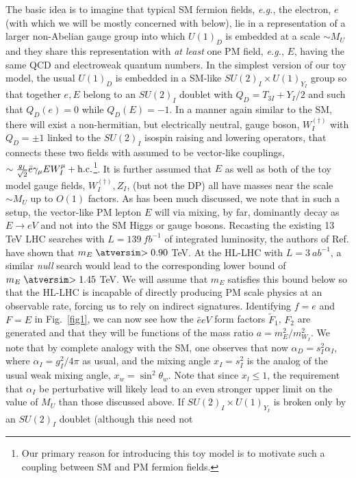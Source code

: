 \documentclass[14pt]{article}
\def\eg{{\it e.g.}}
\def\to{\rightarrow}
\def\matth{\mathsurround=0pt}
\def\gsim{\mathrel{\mathpalette\atversim>}}
\def\atversim#1#2{\lower0.7ex\vbox{\baselineskip\zatskip\lineskip\zatskip
  \lineskiplimit 0pt\ialign{$\matth#1\hfil##\hfil$\crcr#2\crcr\sim\crcr}}}
\begin{document}
The basic idea is to imagine that typical SM fermion fields, \eg, the electron, $e$ (with which we will be mostly concerned with below),  
lie in a representation of a larger non-Abelian gauge group into which $U(1)_D$ is embedded at a scale 
$\sim M_U$ and they share this representation with {\it at least} one PM field, \eg, $E$, having the same QCD and electroweak quantum numbers. In the simplest version of our toy model, the usual 
$U(1)_D$ is embedded in a SM-like $SU(2)_I\times U(1)_{Y_I}$ group so that 
together $e,E$ belong to an $SU(2)_I$ doublet with $Q_D=T_{3I}+Y_I/2$ and such that $Q_D(e)=0$ while $Q_D(E)=-1$. In a manner again similar to the SM, there will exist a non-hermitian, 
but electrically neutral, gauge boson, $W_I^{(\dagger)}$ with $Q_D=\pm 1$ linked to the $SU(2)_I$ isospin raising and lowering operators, that connects these two fields with assumed to be vector-like 
couplings, $\sim \frac{g_I}{\sqrt 2} \bar e\gamma_\mu EW_I^\mu+{\rm {h.c.}}${\footnote{Our primary reason for introducing this toy model is to motivate such a coupling between SM and PM 
fermion fields.}}. It is further assumed that $E$ as well as both of the toy model gauge fields, $W_I^{(\dagger)},Z_I$,  (but not the DP) all have masses near the 
scale $\sim M_U$ up to $O(1)$ factors. As has been much discussed, we note that in such a setup, the vector-like PM lepton $E$ will via mixing, by far, dominantly decay as $E\to eV$ and not into the 
SM Higgs or gauge bosons. Recasting the existing 13 TeV LHC searches with $L=139 ~fb^{-1}$ of integrated luminosity, the authors of Ref.\cite{Guedes:2021oqx} have shown that $m_E\gsim 0.90$ 
TeV. At the HL-LHC with $L=3 ~ab^{-1}$, a similar {\it null} search would lead to the corresponding lower bound of $m_E\gsim 1.45$ TeV. 
We will assume that $m_E$ satisfies this bound below so that the HL-LHC is incapable of directly producing PM scale physics at an observable rate, forcing us to rely on indirect signatures.  
Identifying $f=e$ and $F=E$ in Fig.~\ref{fig1}, we can now see how the $\bar eeV$ form factors $\tilde F_1$, $F_2$ are generated and that they  
will be functions of the mass ratio $a=m_E^2/m_{W_I}^2$. We note that by complete analogy with the SM, one observes that now $\alpha_D=s_I^2 \alpha_I$, where $\alpha_I=g_I^2/4\pi$ as usual, 
and the mixing angle $x_I=s_I^2$ is the analog of the usual weak mixing angle, $x_w=\sin^2\theta_w$.  Note that since $x_l \leq 1$, the requirement that $\alpha_I$ be perturbative will likely lead to 
an even stronger upper limit on the value of $M_U$ than those discussed above. If $SU(2)_I\times U(1)_{Y_I}$ is broken only by an $SU(2)_I$ doublet (although this need not 
\end{document}
